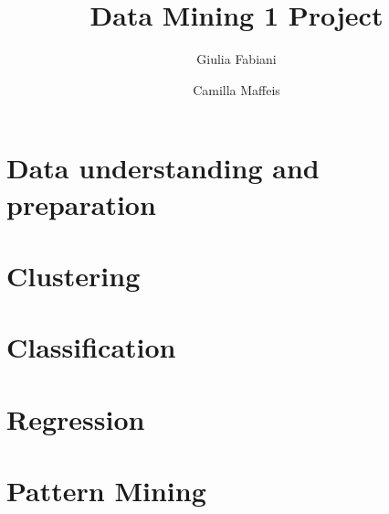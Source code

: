 \documentclass[a4paper, 10pt, twocolumn, DIV=calc]{scrartcl}
\begin{document}
\author{Giulia Fabiani \and Camilla Maffeis}
\title{Data Mining 1 Project}
\date{}

\maketitle

\section{Data understanding and preparation}

\section{Clustering}

\section{Classification}

\section{Regression}

\section{Pattern Mining}

\end{document}
